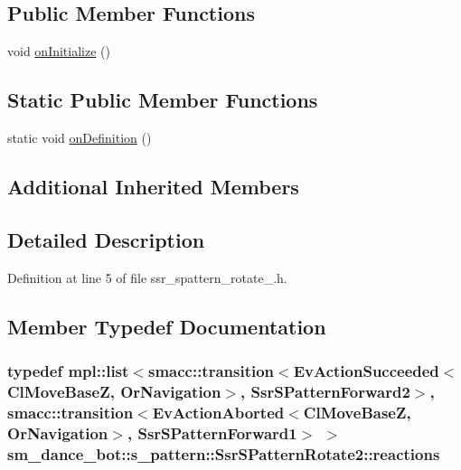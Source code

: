 \subsection*{Public Member Functions}
\begin{DoxyCompactItemize}
\item 
void \hyperlink{structsm__dance__bot_1_1s__pattern_1_1SsrSPatternRotate2_a6bcd859bd5af6504ef03e5cd5dda3d29}{on\+Initialize} ()
\end{DoxyCompactItemize}
\subsection*{Static Public Member Functions}
\begin{DoxyCompactItemize}
\item 
static void \hyperlink{structsm__dance__bot_1_1s__pattern_1_1SsrSPatternRotate2_a0629eac8873a7a4b07f6c4013bf8c8a5}{on\+Definition} ()
\end{DoxyCompactItemize}
\subsection*{Additional Inherited Members}


\subsection{Detailed Description}


Definition at line 5 of file ssr\+\_\+spattern\+\_\+rotate\+\_.\+h.



\subsection{Member Typedef Documentation}
\subsubsection[{\texorpdfstring{reactions}{reactions}}]{\setlength{\rightskip}{0pt plus 5cm}typedef mpl\+::list$<${\bf smacc\+::transition}$<$Ev\+Action\+Succeeded$<${\bf Cl\+Move\+BaseZ}, {\bf Or\+Navigation}$>$, {\bf Ssr\+S\+Pattern\+Forward2}$>$, {\bf smacc\+::transition}$<$Ev\+Action\+Aborted$<${\bf Cl\+Move\+BaseZ}, {\bf Or\+Navigation}$>$, {\bf Ssr\+S\+Pattern\+Forward1}$>$ $>$ {\bf sm\+\_\+dance\+\_\+bot\+::s\+\_\+pattern\+::\+Ssr\+S\+Pattern\+Rotate2\+::reactions}}\hypertarget{structsm__dance__bot_1_1s__pattern_1_1SsrSPatternRotate2_ad489a09f2ef7d70c2fa95771de457c25}{}\label{structsm__dance__bot_1_1s__pattern_1_1SsrSPatternRotate2_ad489a09f2ef7d70c2fa95771de457c25}


